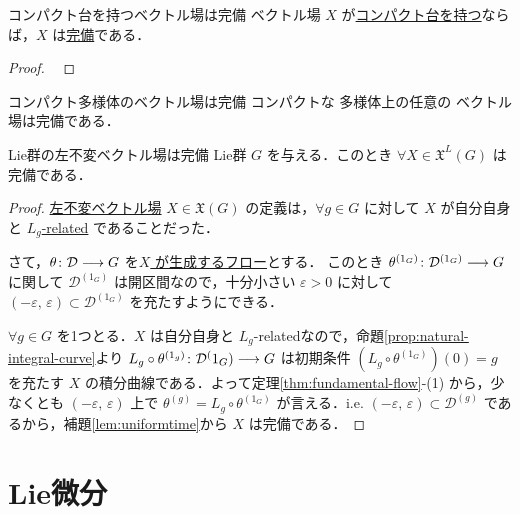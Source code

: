 \documentclass[geometry_main]{subfiles}
\begin{document}
\begin{mytheo}[label=thm:complete-compace]{コンパクト台を持つベクトル場は完備}
    \cinfty ベクトル場 $X$ が\hyperref[def:vecf]{コンパクト台を持つ}ならば，$X$ は\hyperref[def:complete-vecf]{完備}である．
\end{mytheo}

\begin{proof}
    ~\cite[p.216, Theorem 9.16]{Lee2012smooth}
\end{proof}


\begin{mycol}[label=col:complete-compact]{コンパクト多様体のベクトル場は完備}
    コンパクトな \cinfty 多様体上の任意の \cinfty ベクトル場は完備である．
\end{mycol}


\begin{mytheo}[label=thm:left-invariant-complete]{Lie群の左不変ベクトル場は完備}
    Lie群 $G$ を与える．このとき $\forall X \in \mathfrak{X}^L(G)$ は完備である．
\end{mytheo}

\begin{proof}
    \hyperref[def:left-invariant]{左不変ベクトル場} $X \in \mathfrak{X}(G)$ の定義は，$\forall g \in G$ に対して $X$ が自分自身と \hyperref[def:F-related]{$L_g$-related} であることだった．

    さて，$\theta \colon \mathcal{D} \longrightarrow G$ を\hyperref[thm:fundamental-flow]{$X$ が生成するフロー}とする．
    このとき $\theta^{(1_G)} \colon \mathcal{D}^{(1_G)} \longrightarrow G$ に関して $\mathcal{D}^{(1_G)}$ は開区間なので，十分小さい $\varepsilon > 0$ に対して $(-\varepsilon,\, \varepsilon) \subset \mathcal{D}^{(1_G)}$ を充たすようにできる．

    $\forall g \in G$ を1つとる．$X$ は自分自身と $L_g$-relatedなので，命題\ref{prop:natural-integral-curve}より $L_g \circ \theta^{(1_g)} \colon \mathcal{D}^(1_G) \longrightarrow G$ は初期条件 $(L_g \circ \theta^{(1_G)})(0) = g$ を充たす $X$ の積分曲線である．よって定理\ref{thm:fundamental-flow}-(1) から，少なくとも $(-\varepsilon,\, \varepsilon)$ 上で $\theta^{(g)} = L_g \circ \theta^{(1_G)}$ が言える．i.e. $(-\varepsilon,\, \varepsilon) \subset \mathcal{D}^{(g)}$ であるから，補題\ref{lem:uniformtime}から $X$ は完備である．
\end{proof}

\section{Lie微分}
\end{document}
